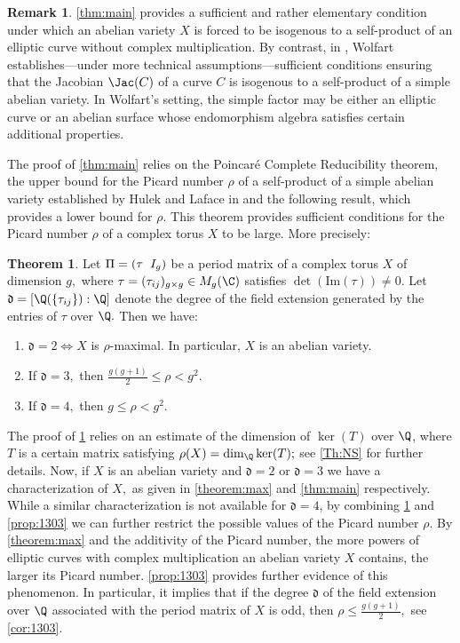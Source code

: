 \documentclass[11pt,leqno]{article}
\theoremstyle{definition}
\newtheorem{theorem}{Theorem}[section]
\newtheorem{remark}{Remark}[section]
\begin{document}
\begin{remark}
    \cref{thm:main} provides a sufficient and rather elementary condition under which an abelian variety $X$ is forced to be isogenous to a self-product of an elliptic curve without complex multiplication. 
    By contrast, in \cite[Theorem~9]{wolfart2005triangle}, Wolfart establishes—under more technical assumptions—sufficient conditions ensuring that the Jacobian $\Jac(C)$ of a curve $C$ is isogenous to a self-product of a simple abelian variety. 
    In Wolfart’s setting, the simple factor may be either an elliptic curve or an abelian surface whose endomorphism algebra satisfies certain additional properties.
\end{remark}

The proof of \cref{thm:main} relies on the Poincaré Complete Reducibility theorem, the upper bound for the Picard number $\rho$ of a self-product of a simple abelian variety established by Hulek and Laface in \cite[Corollary 2.5]{hulek2019picard} and the following result, which provides a lower bound for $\rho.$ This theorem provides sufficient conditions for the Picard number $\rho$ of a complex torus $X$ to be large. More precisely:

\begin{theorem}
\label{thm:NS1002}
Let $\Pi=(\tau\hspace{0.2cm}I_g)$ be a period matrix of a complex torus $X$ of dimension $g,$ where $\tau=(\tau_{ij})_{g\times g}\in M_g(\C)$ satisfies $\det(\mathrm{Im}(\tau))\neq0.$ Let $\mathfrak{d}=[\Q(\{\tau_{ij}\}):\Q]$ denote the degree of the field extension generated by the entries of $\tau$ over $\Q.$ Then we have:
  \begin{enumerate}
      \item  $\mathfrak{d}=2\Longleftrightarrow X$ is $\rho$-maximal. In particular, $X$ is an abelian variety. 

      \item If $\mathfrak{d}=3,$ then $\frac{g(g+1)}{2}\leq \rho<g^2$.
      
      \item If $\mathfrak{d}=4,$ then $g\leq\rho<g^2$.  
  \end{enumerate}
\end{theorem}
The proof of \cref{thm:NS1002} relies on an estimate of the dimension of $\ker (T)$ over $\Q$, where $T$ is a certain matrix satisfying $\rho(X)=\dim_{\Q}\ker (T);$ see \cref{Th:NS} for further details. Now, if $X$ is an abelian variety and $\mathfrak{d}=2$ or $\mathfrak{d}=3$ we have a characterization of $X,$ as given in \cref{theorem:max} and \cref{thm:main} respectively. While a similar characterization is not available for $\mathfrak{d}=4$, by combining \cref{thm:NS1002} and \cref{prop:1303} we can further restrict the possible values of the Picard number $\rho$. By \cref{theorem:max} and the additivity of the Picard number, the more powers of elliptic curves with complex multiplication an abelian variety $X$ contains, the larger its Picard number. \cref{prop:1303} provides further evidence of this phenomenon. In particular, it implies that if the degree $\mathfrak{d}$ of the field extension over $\Q$ associated with the period matrix of $X$ is odd, then $\rho\leq\frac{g(g+1)}{2},$ see \cref{cor:1303}.  
\end{document}
